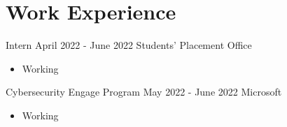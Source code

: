 \section*{\sc Work Experience}
\vspace{-2mm}
\hrulefill
\vspace{1mm}

\excventry
{Intern}
{April 2022 - June 2022}
{Students' Placement Office}
{
  \begin{itemize}
    \item Working
  \end{itemize}
}


\excventry
{Cybersecurity Engage Program}
{May 2022 - June 2022}
{Microsoft}
{
  \begin{itemize}
    \item Working
  \end{itemize}
}

\vspace{-2mm}
